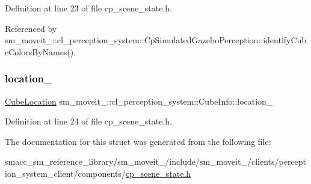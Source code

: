 Definition at line 23 of file cp\+\_\+scene\+\_\+state.\+h.



Referenced by sm\+\_\+moveit\+\_\+::cl\+\_\+perception\+\_\+system\+::\+Cp\+Simulated\+Gazebo\+Perception\+::identify\+Cube\+Colors\+By\+Names().

\mbox{\label{structsm__moveit__4_1_1cl__perception__system_1_1CubeInfo_ae8534eefae1235f3b98f509916710d63}} 
\subsubsection{\texorpdfstring{location\+\_\+}{location\_}}
{\footnotesize\ttfamily \hyperlink{namespacesm__moveit__4_1_1cl__perception__system_a0d1b8834532a7cf9d19670791eece6d1}{Cube\+Location} sm\+\_\+moveit\+\_\+::cl\+\_\+perception\+\_\+system\+::\+Cube\+Info\+::location\+\_\+}



Definition at line 24 of file cp\+\_\+scene\+\_\+state.\+h.



The documentation for this struct was generated from the following file\+:\begin{DoxyCompactItemize}
\item 
smacc\+\_\+sm\+\_\+reference\+\_\+library/sm\+\_\+moveit\+\_/include/sm\+\_\+moveit\+\_/clients/perception\+\_\+system\+\_\+client/components/\hyperlink{cp__scene__state_8h}{cp\+\_\+scene\+\_\+state.\+h}\end{DoxyCompactItemize}
